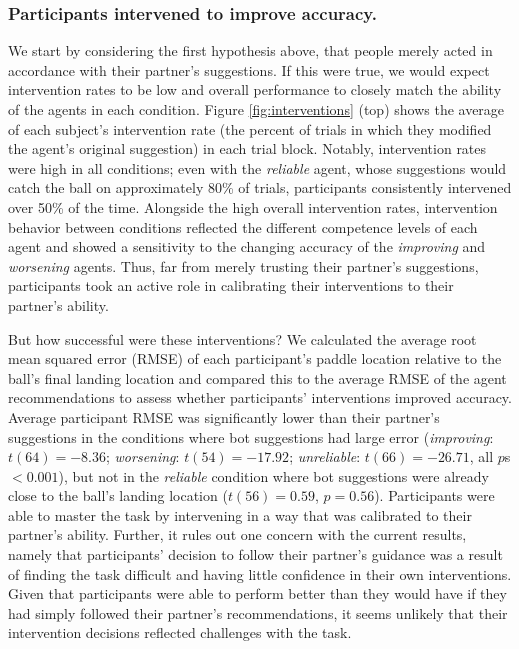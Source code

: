 \documentclass[10pt,letterpaper]{article}
\begin{document}
\subsubsection{Participants intervened to improve accuracy.} 

We start by considering the first hypothesis above, that people merely acted in accordance with their partner's suggestions. If this were true, we would expect intervention rates to be low and overall performance to closely match the ability of the agents in each condition. Figure \ref{fig:interventions} (top) shows the average of each subject's intervention rate (the percent of trials in which they modified the agent's original suggestion) in each trial block. Notably, intervention rates were high in all conditions; even with the \textit{reliable} agent, whose suggestions would catch the ball on approximately 80\% of trials, participants consistently intervened over 50\% of the time. Alongside the high overall intervention rates, intervention behavior between conditions reflected the different competence levels of each agent and showed a sensitivity to the changing accuracy of the \textit{improving} and \textit{worsening} agents. Thus, far from merely trusting their partner's suggestions, participants took an active role in calibrating their interventions to their partner's ability.

But how successful were these interventions? We calculated the average root mean squared error (RMSE) of each participant's paddle location relative to the ball's final landing location and compared this to the average RMSE of the agent recommendations to assess whether participants' interventions improved accuracy. Average participant RMSE was significantly lower than their partner's suggestions in the conditions where bot suggestions had large error (\textit{improving}: $t(64) = -8.36$; \textit{worsening}: $t(54) = -17.92$; \textit{unreliable}: $t(66) = -26.71$, all $p$s $<0.001$), but not in the \textit{reliable} condition where bot suggestions were already close to the ball's landing location ($t(56) = 0.59$, $p = 0.56$). Participants were able to master the task by intervening in a way that was calibrated to their partner's ability. Further, it rules out one concern with the current results, namely that participants' decision to follow their partner's guidance was a result of finding the task difficult and having little confidence in their own interventions. Given that participants were able to perform better than they would have if they had simply followed their partner's recommendations, it seems unlikely that their intervention decisions reflected challenges with the task.
\end{document}
